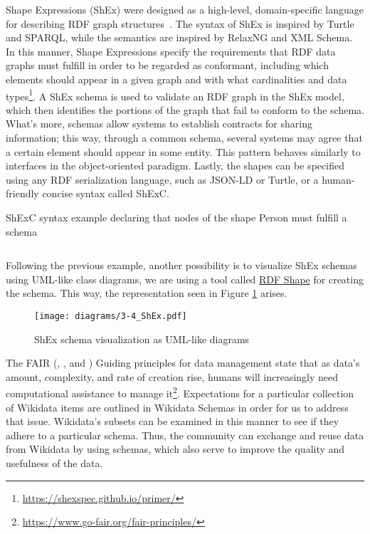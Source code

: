 Shape Expressions (ShEx) were designed as a high-level, domain-specific language for describing RDF graph structures~\cite{https://doi.org/10.48550/arxiv.2110.11709}. The syntax of ShEx is inspired by Turtle and SPARQL, while the semantics are inspired by RelaxNG and XML Schema. In this manner, Shape Expressions specify the requirements that RDF data graphs must fulfill in order to be regarded as conformant, including which elements should appear in a given graph and with what cardinalities and data types\footnote{\url{https://shexspec.github.io/primer/}}. A ShEx schema is used to validate an RDF graph in the ShEx model, which then identifies the portions of the graph that fail to conform to the schema. What's more, schemas allow systems to establish contracts for sharing information; this way, through a common schema, several systems may agree that a certain element should appear in some entity. This pattern behaves similarly to interfaces in the object-oriented paradigm. Lastly, the shapes can be specified using any RDF serialization language, such as JSON-LD or Turtle, or a human-friendly concise syntax called ShExC.

\begin{code}
    \caption{ShExC syntax example declaring that nodes of the shape Person must fulfill a schema}
    \inputminted{shex}{listings/shex.shex}
\end{code}

Following the previous example, another possibility is to visualize ShEx schemas using UML-like class diagrams, we are using a tool called \href{https://rdfshape.weso.es/shexInfo}{RDF Shape} for creating the schema. This way, the representation seen in Figure \ref{fig:RDFshape} arises.

\begin{figure}[ht]
    \centering
    \texttt{[image: diagrams/3-4\_ShEx.pdf]}
    \caption{ShEx schema visualization as UML-like diagrams}
    \label{fig:RDFshape}
\end{figure}

The FAIR (, ,  and ) Guiding principles for data management state that as data's amount, complexity, and rate of creation rise, humans will increasingly need computational assistance to manage it\footnote{\url{https://www.go-fair.org/fair-principles/}}. Expectations for a particular collection of Wikidata items are outlined in Wikidata Schemas in order for us to address that issue. Wikidata's subsets can be examined in this manner to see if they adhere to a particular schema. Thus, the community can exchange and reuse data from Wikidata by using schemas, which also serve to improve the quality and usefulness of the data.

